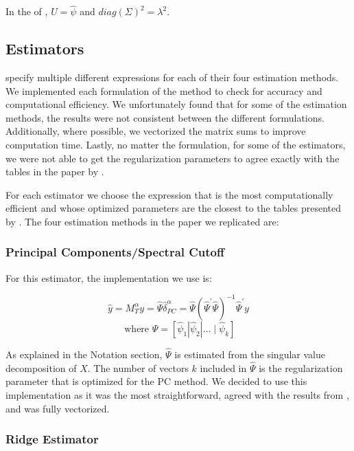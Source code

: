 In the of \citeauthor{carrasco2016sample}, $U = \hat{\psi}$ and $diag(\Sigma)^{2} = \lambda^{2}$.

\subsection{Estimators} \label{sec::estimators}

\citeauthor{carrasco2016sample} specify multiple different expressions for each of their four estimation methods. We implemented each formulation of the method to check for accuracy and computational efficiency. We unfortunately found that for some of the estimation methods, the results were not consistent between the different formulations. Additionally, where possible, we vectorized the matrix sums to improve computation time. Lastly, no matter the formulation, for some of the estimators, we were not able to get the regularization parameters to agree exactly with the tables in the paper by \citeauthor{carrasco2016sample}.


For each estimator we choose the expression that is the most computationally efficient and whose optimized parameters are the closest to the tables presented by \citeauthor{carrasco2016sample}. The four estimation methods in the paper we replicated are:

\subsubsection{Principal Components/Spectral Cutoff}

For this estimator, the implementation we use is:

\[\widehat{y} = M_{T}^{\alpha} y = \widehat{\Psi} \hat{\delta}_{PC}^{\alpha} = \widehat{\Psi} \left(\widehat{\Psi}^{\prime} \widehat{\Psi}\right)^{-1} \widehat{\Psi}^{\prime} y\]
\[\text{ where } \widehat{\Psi} = \left[\widehat{\psi}_{1}\left|\widehat{\psi}_{2}\right| \ldots \mid \widehat{\psi}_{k}\right]\]

As explained in the Notation section, $\hat{\Psi}$ is estimated from the singular value decomposition of $X$. The number of vectors $k$ included in $\hat{\Psi}$ is the regularization parameter that is optimized for the PC method. We decided to use this implementation as it was the most straightforward, agreed with the results from \citeauthor{carrasco2016sample}, and was fully vectorized.

\subsubsection{Ridge Estimator} \label{sec::ridge}


